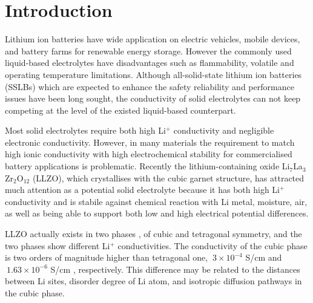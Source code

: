 \documentclass[twoside,twocolumn,9pt]{article}
\begin{document}



\section{Introduction}

Lithium ion batteries have wide application on electric vehicles, mobile devices, and battery
farms for renewable energy storage.  However the commonly used liquid-based electrolytes have
disadvantages such as flammability, volatile  and operating temperature limitations.
Although all-solid-state lithium ion batteries (SSLBs) which are expected to enhance the safety
reliability and performance issues have been long sought, the conductivity of solid electrolytes can not
keep competing at the level of the existed liquid-based counterpart.

Most solid electrolytes require both high Li$^+$ conductivity and negligible electronic
conductivity. However, in many materials the requirement to match high ionic conductivity with high electrochemical stability for commercialised battery applications is problematic. Recently the lithium-containing oxide  Li$_7$La$_3$Zr$_2$O$_{12}$ (LLZO)\cite{Murugan:2007eg, Samson:2019eo, Kataoka:2020bg}, which crystallises with the cubic garnet structure, has attracted much attention as a potential solid electrolyte because it has both high Li$^+$ conductivity and is stabile against chemical
reaction with Li metal, moisture, air, as well as being able to support both low and high electrical potential differences.

LLZO actually exists in two phases \cite{Geiger:2011cg}, of
cubic and tetragonal symmetry, and the two phases show different Li$^+$ conductivities. The conductivity of the cubic
phase is two orders of magnitude higher than tetragonal one, $~3\times 10^{-4}$ S/cm \cite{Murugan:2007eg}
and $~1.63\times 10^{-6}$ S/cm \cite{Awaka:2009jv}, respectively.
This difference may be related to the distances between Li sites, disorder degree of Li atom, and isotropic diffusion pathways in the cubic phase.
\end{document}
